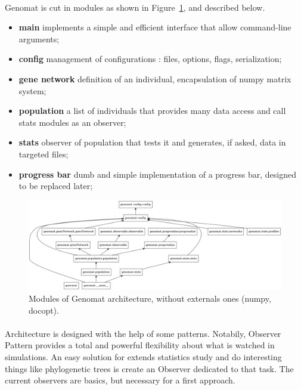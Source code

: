 \documentclass[]{report} %
\begin{document}
	\paragraph*{}
        Genomat is cut in modules as shown in Figure~\ref{fig:umldiag}, and described below.
        \begin{itemize}
                \item \textbf{main} implements a simple and efficient interface that allow command-line arguments;
                \item \textbf{config} management of configurations : files, options, flags, serialization;
                \item \textbf{gene network} definition of an individual, encapsulation of numpy matrix system;
                \item \textbf{population} a list of individuals that provides many data access and call stats modules as an observer;
                \item \textbf{stats} observer of population that tests it and generates, if asked, data in targeted files;
                \item \textbf{progress bar} dumb and simple implementation of a progress bar, designed to be replaced later;
        \end{itemize}

        \begin{figure}[H] 
                \centering
                \includegraphics[width=\textwidth]{packages_genomat.png}
                \caption{\footnotesize Modules of Genomat architecture, without externals ones (numpy, docopt).}
                \label{fig:umldiag}
        \end{figure}

	\paragraph*{}
        Architecture is designed with the help of some patterns. 
        Notabily, Observer Pattern provides a total and powerful flexibility about what is watched in simulations.
        An easy solution for extends statistics study and do interesting things like phylogenetic trees is create an Observer dedicated to that task.
        The current observers are basics, but necessary for a first approach.
\end{document}
